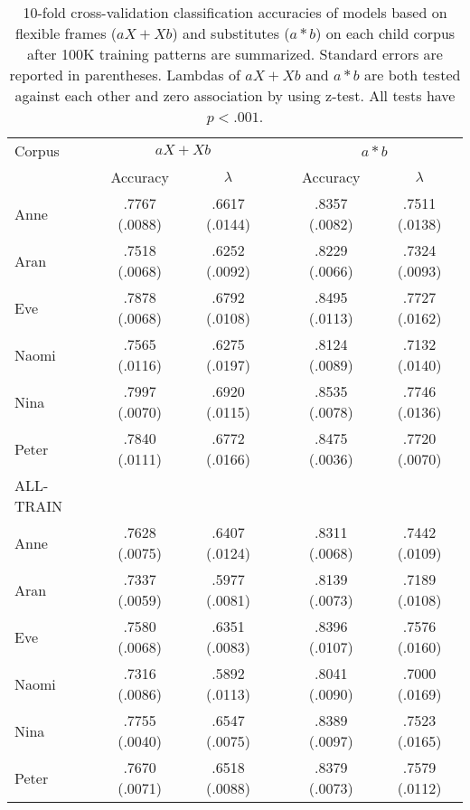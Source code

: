 \begin{table}[ht]
  \small
  \centering
  \caption{10-fold cross-validation classification accuracies of models based
    on flexible frames ($aX + Xb$) and substitutes ($a*b$) on each child corpus
    after 100K training patterns are summarized.  Standard errors are reported
    in parentheses.  Lambdas of $aX+Xb$ and $a*b$ are both tested against each
    other and zero association by using z-test.  All tests have $p<.001$.}
  \begin{tabular}{lccccc}
    \hline
    Corpus & \multicolumn{2}{c}{$aX+Xb$} && \multicolumn{2}{c}{$a*b$} \\
    \cline{2-3}
    \cline{5-6}
    & Accuracy & $\lambda$ && Accuracy & $\lambda$\\
    \hline
    Anne  & .7767 (.0088) & .6617 (.0144) && .8357 (.0082) & .7511 (.0138)\\
    Aran  & .7518 (.0068) & .6252 (.0092) && .8229 (.0066) & .7324 (.0093)\\
    Eve   & .7878 (.0068) & .6792 (.0108) && .8495 (.0113) & .7727 (.0162)\\
    Naomi & .7565 (.0116) & .6275 (.0197) && .8124 (.0089) & .7132 (.0140)\\
    Nina  & .7997 (.0070) & .6920 (.0115) && .8535 (.0078) & .7746 (.0136)\\
    Peter & .7840 (.0111) & .6772 (.0166) && .8475 (.0036) & .7720 (.0070)\\
    \hline
    ALL-TRAIN & & && &\\
    \hline
    Anne  & .7628 (.0075) & .6407 (.0124) && .8311 (.0068) & .7442 (.0109)\\
    Aran  & .7337 (.0059) & .5977 (.0081) && .8139 (.0073) & .7189 (.0108)\\
    Eve   & .7580 (.0068) & .6351 (.0083) && .8396 (.0107) & .7576 (.0160)\\
    Naomi & .7316 (.0086) & .5892 (.0113) && .8041 (.0090) & .7000 (.0169)\\
    Nina  & .7755 (.0040) & .6547 (.0075) && .8389 (.0097) & .7523 (.0165)\\
    Peter & .7670 (.0071) & .6518 (.0088) && .8379 (.0073) & .7579 (.0112)\\
    \hline
  \end{tabular}
  \label{t:framevssub100K}
\end{table}


